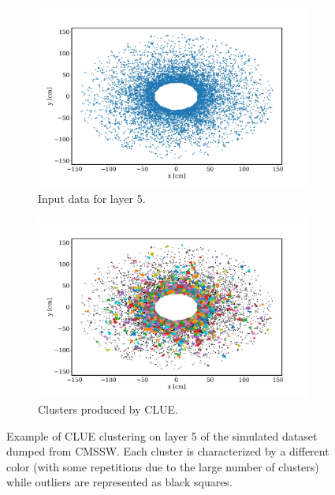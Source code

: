 \begin{figure}[ht]
    \centering
    \begin{subfigure}[t]{0.49\textwidth}
    \includegraphics[width=\textwidth]{media/whole_detector.jpg}
    \caption{Input data for layer 5.}
    \end{subfigure}
    \begin{subfigure}[t]{0.49\textwidth}
    \includegraphics[width=\textwidth]{media/whole_detector_clusters.jpg}
    \caption{Clusters produced by CLUE.}
    \end{subfigure}
    \caption{Example of CLUE clustering on layer 5 of the simulated dataset dumped from CMSSW. Each cluster is characterized by a different color (with some repetitions due to the large number of clusters) while outliers are represented as black squares.}
    \label{fig:whole_detector}
\end{figure}

